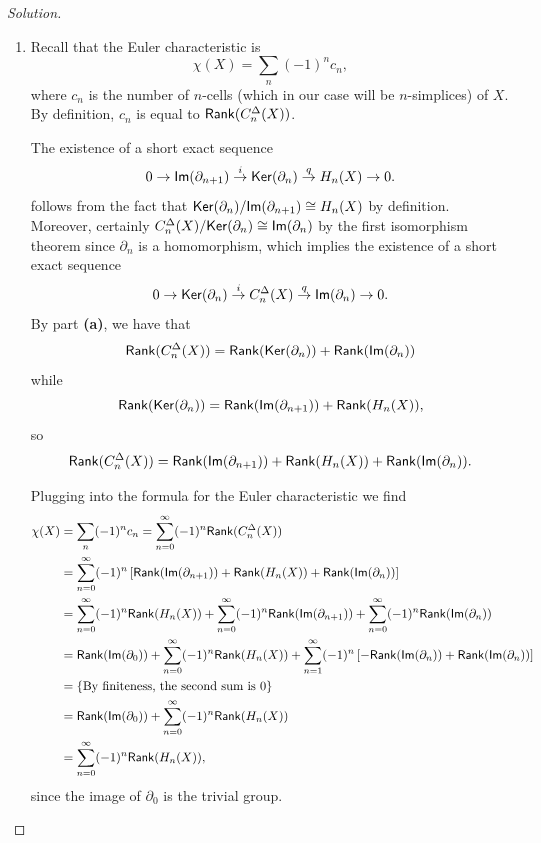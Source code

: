 \begin{proof}[Solution]
\begin{enumerate}[font=\normalfont,label=\textbf{(\alph*)}, wide]
\item Recall that the Euler characteristic is
\[
\chi(X) = \sum_n (-1)^nc_n,
\]
where $c_n$ is the number of $n$-cells (which in our case will be $n$-simplices) of $X$. By definition, $c_n$ is equal to $\mathsf{Rank}(C_n^\Delta(X))$.

The existence of a short exact sequence
\[
0 \to \mathsf{Im}(\partial_{n+1}) \overset{i}{\to} \mathsf{Ker}(\partial_n) \overset{q}{\to} H_n(X) \to 0.
\]
follows from the fact that $\mathsf{Ker}(\partial_n)/\mathsf{Im}(\partial_{n+1}) \cong H_n(X)$ by definition. Moreover, certainly $C_n^\Delta (X)/\mathsf{Ker}(\partial_n) \cong \mathsf{Im}(\partial_n)$ by the first isomorphism theorem since $\partial_n$ is a homomorphism, which implies the existence of a short exact sequence
\[
0 \to \mathsf{Ker}(\partial_n) \overset{i}{\to} C_n^\Delta (X) \overset{q}{\to} \mathsf{Im}(\partial_n) \to 0.
\]
By part \textbf{(a)}, we have that
\[
\mathsf{Rank}(C_n^\Delta(X))  = \mathsf{Rank}(\mathsf{Ker}(\partial_{n})) + \mathsf{Rank}(\mathsf{Im}(\partial_n))
\]
 while
 \[
 \mathsf{Rank}(\mathsf{Ker}(\partial_n))  = \mathsf{Rank}(\mathsf{Im}(\partial_{n+1})) + \mathsf{Rank}(H_n(X)),
\]
so
\[
\mathsf{Rank}(C_n^\Delta(X))  = \mathsf{Rank}(\mathsf{Im}(\partial_{n+1})) + \mathsf{Rank}(H_n(X)) + \mathsf{Rank}(\mathsf{Im}(\partial_n)).
\]

Plugging into the formula for the Euler characteristic we find
\[
\begin{aligned}
\chi(X) &= \sum_n (-1)^nc_n = \sum_{n = 0}^\infty (-1)^n \mathsf{Rank}(C_n^\Delta(X)) \\
        &= \sum_{n = 0}^\infty (-1)^n \left[ \mathsf{Rank}(\mathsf{Im}(\partial_{n+1})) + \mathsf{Rank}(H_n(X)) + \mathsf{Rank}(\mathsf{Im}(\partial_n)) \right] \\
        &= \sum_{n = 0}^\infty (-1)^n  \mathsf{Rank}(H_n(X)) + \sum_{n = 0}^\infty (-1)^n \mathsf{Rank}(\mathsf{Im}(\partial_{n+1})) + \sum_{n = 0}^\infty (-1)^n \mathsf{Rank}(\mathsf{Im}(\partial_n)) \\
        &= \mathsf{Rank}(\mathsf{Im}(\partial_0)) + \sum_{n = 0}^\infty (-1)^n  \mathsf{Rank}(H_n(X)) +  \sum_{n = 1}^\infty (-1)^n\left[ -\mathsf{Rank}(\mathsf{Im}(\partial_{n}))  + \mathsf{Rank}(\mathsf{Im}(\partial_{n}))\right] \\
        &= \{\text{By finiteness, the second sum is 0}\} \\
        &= \mathsf{Rank}(\mathsf{Im}(\partial_0)) + \sum_{n = 0}^\infty (-1)^n  \mathsf{Rank}(H_n(X)) \\
        &= \sum_{n = 0}^\infty (-1)^n  \mathsf{Rank}(H_n(X)), \\
\end{aligned}
\]
since the image of $\partial_0$ is the trivial group.
\end{enumerate}
\end{proof}

